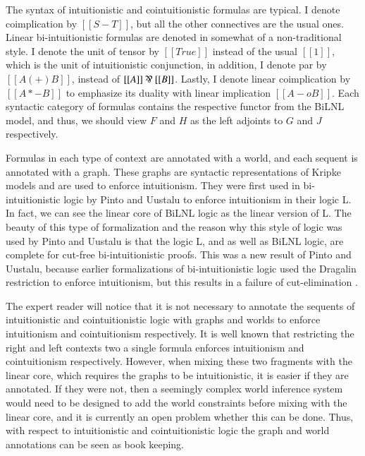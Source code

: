 \documentclass{lmcs}
\begin{document}
The syntax of intuitionistic and cointuitionistic formulas are
typical.  I denote coimplication by $[[S - T]]$, but all the other
connectives are the usual ones. Linear bi-intuitionistic formulas are
denoted in somewhat of a non-traditional style. I denote the unit of
tensor by $[[True]]$ instead of the usual $[[1]]$, which is the unit
of intuitionistic conjunction, in addition, I denote par by $[[A (+)
    B]]$, instead of $[[A]] \parr [[B]]$.  Lastly, I denote linear
coimplication by $[[A *- B]]$ to emphasize its duality with linear
implication $[[A -o B]]$.  Each syntactic category of formulas
contains the respective functor from the BiLNL model, and thus, we
should view $F$ and $H$ as the left adjoints to $G$ and $J$
respectively.

Formulas in each type of context are annotated with a world, and each
sequent is annotated with a graph.  These graphs are syntactic
representations of Kripke models and are used to enforce intuitionism.
They were first used in bi-intuitionistic logic by Pinto and Uustalu
\cite{Pinto:2009} to enforce intuitionism in their logic L.  In fact,
we can see the linear core of BiLNL logic as the linear version of L.
The beauty of this type of formalization and the reason why this style
of logic was used by Pinto and Uustalu is that the logic L, and as
well as BiLNL logic, are complete for cut-free bi-intuitionistic
proofs.  This was a new result of Pinto and Uustalu, because earlier
formalizations of bi-intuitionistic logic \cite{Crolard:2001} used the
Dragalin restriction \cite{Dragalin:1988} to enforce intuitionism, but
this results in a failure of cut-elimination
\cite{Schellinx:1991,Pinto:2009}.

The expert reader will notice that it is not necessary to annotate the
sequents of intuitionistic and cointuitionistic logic with graphs and
worlds to enforce intuitionism and cointuitionism respectively. It is
well known that restricting the right and left contexts two a single
formula enforces intuitionism and cointuitionism respectively.
However, when mixing these two fragments with the linear core, which
requires the graphs to be intuitionistic, it is easier if they are
annotated.  If they were not, then a seemingly complex world inference
system would need to be designed to add the world constraints before
mixing with the linear core, and it is currently an open problem
whether this can be done.  Thus, with respect to intuitionistic and
cointuitionistic logic the graph and world annotations can be seen as
book keeping.
\end{document}
